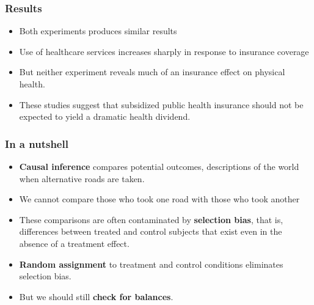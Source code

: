 \documentclass{beamer}
\begin{document}

\begin{frame}
\frametitle{Results}
\begin{itemize}
	\item Both experiments produces similar results
	\item Use of healthcare services increases sharply in response to insurance coverage
	\item But neither experiment reveals much of an insurance effect on physical health.
	\item These studies suggest that subsidized public health insurance should not be expected
to yield a dramatic health dividend.
\end{itemize}

\end{frame}


\begin{frame}
\frametitle{In a nutshell}
\begin{itemize}
	\item \textbf{Causal inference} compares potential outcomes, descriptions of the world when alternative roads are taken.
	\item We cannot compare those who took one road with those who took another
	\item These comparisons are often contaminated by \textbf{selection
bias}, that is, differences between treated and control subjects that
exist even in the absence of a treatment effect.
	\item \textbf{Random assignment} to treatment and control
conditions eliminates selection bias.
	\item But we should still \textbf{check for balances}.
\end{itemize}


\end{frame}

\end{document}
